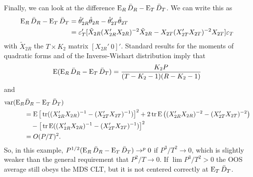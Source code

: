 \documentclass[11pt]{article}
\newcommand{\e}{\varepsilon}
\newcommand{\eb}{\mathbf{\e}}
\begin{document}
Finally, we can look at the difference $\operatorname{E}_R \bar{D}_R - \operatorname{E}_T
\bar{D}_T$.  We can write this as
\begin{align*}
  \E_R \oosA - \E_T \oosB &= \hat{\theta}_{2R}'
  \hat{\theta}_{2R} - \hat{\theta}_{2T}' \hat{\theta}_{2T} \\ &=
  \eb_T'[\tilde{X}_{2R}(X_{2R}'X_{2R})^{-2}
  \tilde{X}_{2R} - X_{2T}(X_{2T}'X_{2T})^{-2} X_{2T} ] \eb_T
\end{align*}
with $\tilde{X}_{2R}$ the $T \times K_2$ matrix $[X_{2R}'\ 0]'$.
Standard results for the moments of quadratic forms and of the
Inverse-Wishart distribution \citep{Haf:79} imply that
\begin{equation*}
  \operatorname{E}(\operatorname{E}_R \bar{D}_{R} - \operatorname{E}_T \bar{D}_{T}) = \frac{K_2 P}{(T - K_2 - 1)(R - K_2 - 1)}
\end{equation*}
and
\begin{align*}
  \operatorname{var}(\operatorname{E}_R & \bar{D}_{R} - \operatorname{E}_T \bar{D}_{T}) \\ &= \operatorname{E}
  \big[\operatorname{tr}((X_{2R}'X_{2R})^{-1} - (X_{2T}'X_{2T})^{-1})\big]^2 + 2 \operatorname{tr}
  \operatorname{E}\big((X_{2R}'X_{2R})^{-2} - (X_{2T}'X_{2T})^{-2}\big) \\ &\quad - \big[\operatorname{tr}
  \operatorname{E}((X_{2R}'X_{2R})^{-1} - (X_{2T}'X_{2T})^{-1}) \big]^2 \\ &=
  O(P/T)^2.
\end{align*}
So, in this example, $P^{1/2}(\operatorname{E}_R \bar{D}_{R} - \operatorname{E}_T \bar{D}_{T}) \to^p 0$
if $P^3/T^2 \to 0$, which is slightly weaker than the general
requirement that $P^2/T \to 0$.  If $\lim P^3/T^2 > 0$ the OOS average
still obeys the MDS CLT, but it is not centered correctly at $\operatorname{E}_T
\bar{D}_{T}$.
\end{document}
